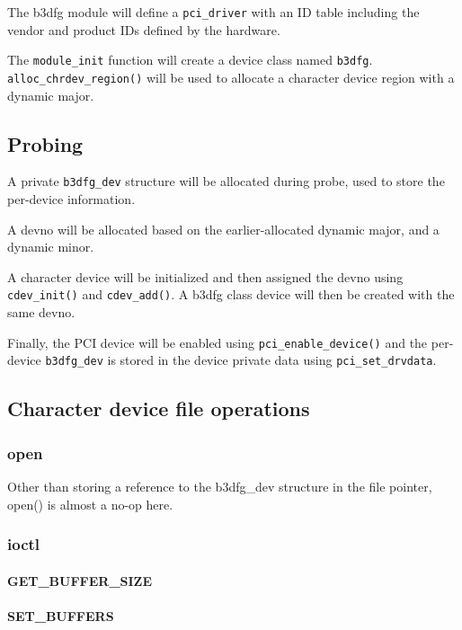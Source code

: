 \documentclass[12pt]{article}
\begin{document}
The b3dfg module will define a \texttt{pci\_driver} with an ID table including the vendor and product IDs defined by the hardware.

The \texttt{module\_init} function will create a device class named \texttt{b3dfg}. \texttt{alloc\_chrdev\_region()} will be used to allocate a character device region with a dynamic major.

\subsection{Probing}

A private \texttt{b3dfg\_dev} structure will be allocated during probe, used to store the per-device information.

A devno will be allocated based on the earlier-allocated dynamic major, and a dynamic minor.

A character device will be initialized and then assigned the devno using \texttt{cdev\_init()} and \texttt{cdev\_add()}. A b3dfg class device will then be created with the same devno.

Finally, the PCI device will be enabled using \texttt{pci\_enable\_device()} and the per-device \texttt{b3dfg\_dev} is stored in the device private data using \texttt{pci\_set\_drvdata}.

\subsection{Character device file operations}

\subsubsection{open}

Other than storing a reference to the b3dfg\_dev structure in the file pointer, open() is almost a no-op here.

\subsubsection{ioctl}

\paragraph{GET\_BUFFER\_SIZE}

\paragraph{SET\_BUFFERS}
\end{document}
